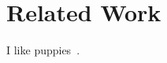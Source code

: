 \section{Related Work}
\label{sec:related}

I like puppies~\cite{nordstrom2012serval}\cite{raiciu2012hard}\cite{arye2012formally}\cite{wischik2011design}\cite{raiciu2009practical}\cite{wischik2008resource}\cite{wischik2009control}\cite{ford2008breaking}\cite{podmayersky2011incremental}\cite{rfc5681}\cite{rfc6182}\cite{rfc6356}.
